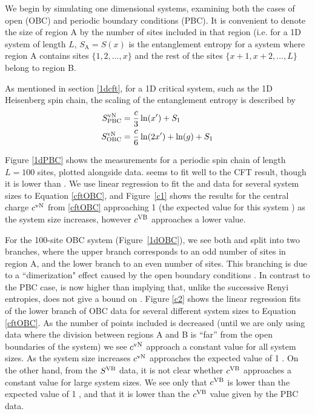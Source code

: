 We begin by simulating one dimensional systems, examining both the cases of
open (OBC) and periodic boundary conditions (PBC).
It is convenient to denote the size of region A by the number of sites included in that region 
(i.e. for a 1D system of length $L$, $S_{\text{A}} = S(x)$ is the entanglement entropy for a system where region A contains sites $\{1,2,\dots,x\}$ and the rest of the sites $\{x+1,x+2,\dots,L\}$
belong to region B.

As mentioned in section \ref{1dcft}, for a 1D critical system, such as the 1D Heisenberg spin chain, the scaling of the entanglement entropy is described by
\begin{align}
	S^{\text{vN}}_{\text{PBC}} &= \frac{c}{3}\ln(x') + S_1 \label{cftPBC}\\
	S^{\text{vN}}_{\text{OBC}} &= \frac{c}{6}\ln(2x') + \ln(g)+ S_1 \label{cftOBC}
\end{align}



Figure \ref{1dPBC} shows the \vb measurements for a periodic spin chain of length $L=100$ sites, plotted alongside \vn data.  \vb seems to fit well to the CFT result, though it is lower than \vN.
We use linear regression to fit the \vb and \vn data for several system sizes to Equation \eqref{cftOBC}, and Figure~\ref{c1} shows the results for the central charge $c^{\rm vN}$ from \eqref{cftOBC} approaching 1 (the expected value for this system \cite{c_is_1}) as the system size increases, however $c^{\rm VB}$ approaches a lower value. 




For the 100-site OBC system (Figure~\ref{1dOBC}), we see both \vn and \vb split into two branches, where the upper branch corresponds to an odd number of sites in region A, and the lower branch to an even number of sites.
This branching is due to a ``dimerization" effect caused by the open boundary conditions \cite{Ian1}.
In contrast to the PBC case, \vb is now higher than \vN{} implying that, unlike the successive Renyi entropies, \vb does not give a bound on \vn.
Figure \ref{c2} shows the linear regression fits of the lower branch of OBC data for several different system sizes to Equation \eqref{cftOBC}.  As the number of points included is decreased (until we are only using data where the division between regions A and B is ``far'' from the open boundaries of the system) we see $c^{\rm vN}$ approach a constant value for all system sizes.  As the system size increases $c^{\rm vN}$ approaches the expected value of 1 \cite{c_is_1}.  On the other hand, from the $S^{\rm VB}$ data, it is not clear whether $c^{\rm VB}$ approaches a constant value for large system sizes.  We see only that $c^{\rm VB}$ is lower than the expected value of 1 \cite{Chh}, and that it is lower than the $c^{\rm VB}$ value given by the PBC data.

